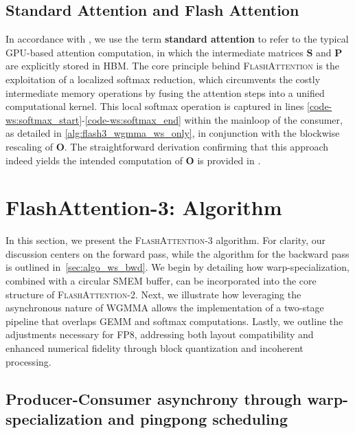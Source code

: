\subsection{Standard Attention and Flash Attention} In accordance with \citet{dao2022flashattention}, we use the term \textbf{standard attention} to refer to the typical GPU-based attention computation, in which the intermediate matrices $\mathbf{S}$ and $\mathbf{P}$ are explicitly stored in HBM. The core principle behind \textsc{FlashAttention} is the exploitation of a localized softmax reduction, which circumvents the costly intermediate memory operations by fusing the attention steps into a unified computational kernel. This local softmax operation is captured in lines \ref{code-ws:softmax_start}-\ref{code-ws:softmax_end} within the mainloop of the consumer, as detailed in \cref{alg:flash3_wgmma_ws_only}, in conjunction with the blockwise rescaling of $\mathbf{O}$. The straightforward derivation confirming that this approach indeed yields the intended computation of $\mathbf{O}$ is provided in \cite[\S 2.3.1]{dao2023flashattention2}.

\section{FlashAttention-3: Algorithm}
\label{sec:algo}

In this section, we present the \textsc{FlashAttention-3} algorithm. For clarity, our discussion centers on the forward pass, while the algorithm for the backward pass is outlined in~\cref{sec:algo_ws_bwd}. We begin by detailing how warp-specialization, combined with a circular SMEM buffer, can be incorporated into the core structure of \textsc{FlashAttention-2}. Next, we illustrate how leveraging the asynchronous nature of WGMMA allows the implementation of a two-stage pipeline that overlaps GEMM and softmax computations. Lastly, we outline the adjustments necessary for FP8, addressing both layout compatibility and enhanced numerical fidelity through block quantization and incoherent processing.

\subsection{Producer-Consumer asynchrony through warp-specialization and pingpong scheduling}
\label{sec:algo_ws}

